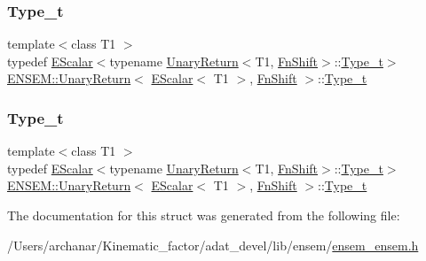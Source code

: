 \subsubsection{\texorpdfstring{Type\_t}{Type\_t}\hspace{0.1cm}{\footnotesize\ttfamily [1/2]}}
{\footnotesize\ttfamily template$<$class T1 $>$ \\
typedef \mbox{\hyperlink{classENSEM_1_1EScalar}{E\+Scalar}}$<$typename \mbox{\hyperlink{structENSEM_1_1UnaryReturn}{Unary\+Return}}$<$T1, \mbox{\hyperlink{structENSEM_1_1FnShift}{Fn\+Shift}}$>$\+::\mbox{\hyperlink{structENSEM_1_1UnaryReturn_3_01EScalar_3_01T1_01_4_00_01FnShift_01_4_a36d8927b4e6f9ea44292d01926dc292a}{Type\+\_\+t}}$>$ \mbox{\hyperlink{structENSEM_1_1UnaryReturn}{E\+N\+S\+E\+M\+::\+Unary\+Return}}$<$ \mbox{\hyperlink{classENSEM_1_1EScalar}{E\+Scalar}}$<$ T1 $>$, \mbox{\hyperlink{structENSEM_1_1FnShift}{Fn\+Shift}} $>$\+::\mbox{\hyperlink{structENSEM_1_1UnaryReturn_3_01EScalar_3_01T1_01_4_00_01FnShift_01_4_a36d8927b4e6f9ea44292d01926dc292a}{Type\+\_\+t}}}

\mbox{\label{structENSEM_1_1UnaryReturn_3_01EScalar_3_01T1_01_4_00_01FnShift_01_4_a36d8927b4e6f9ea44292d01926dc292a}} 
\subsubsection{\texorpdfstring{Type\_t}{Type\_t}\hspace{0.1cm}{\footnotesize\ttfamily [2/2]}}
{\footnotesize\ttfamily template$<$class T1 $>$ \\
typedef \mbox{\hyperlink{classENSEM_1_1EScalar}{E\+Scalar}}$<$typename \mbox{\hyperlink{structENSEM_1_1UnaryReturn}{Unary\+Return}}$<$T1, \mbox{\hyperlink{structENSEM_1_1FnShift}{Fn\+Shift}}$>$\+::\mbox{\hyperlink{structENSEM_1_1UnaryReturn_3_01EScalar_3_01T1_01_4_00_01FnShift_01_4_a36d8927b4e6f9ea44292d01926dc292a}{Type\+\_\+t}}$>$ \mbox{\hyperlink{structENSEM_1_1UnaryReturn}{E\+N\+S\+E\+M\+::\+Unary\+Return}}$<$ \mbox{\hyperlink{classENSEM_1_1EScalar}{E\+Scalar}}$<$ T1 $>$, \mbox{\hyperlink{structENSEM_1_1FnShift}{Fn\+Shift}} $>$\+::\mbox{\hyperlink{structENSEM_1_1UnaryReturn_3_01EScalar_3_01T1_01_4_00_01FnShift_01_4_a36d8927b4e6f9ea44292d01926dc292a}{Type\+\_\+t}}}



The documentation for this struct was generated from the following file\+:\begin{DoxyCompactItemize}
\item 
/\+Users/archanar/\+Kinematic\+\_\+factor/adat\+\_\+devel/lib/ensem/\mbox{\hyperlink{lib_2ensem_2ensem__ensem_8h}{ensem\+\_\+ensem.\+h}}\end{DoxyCompactItemize}
